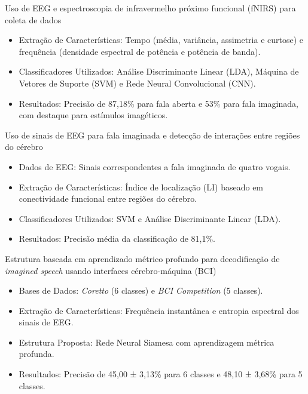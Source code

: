 \documentclass{beamer}
\begin{document}
	\begin{frame}{Uso de EEG e espectroscopia de infravermelho próximo funcional (fNIRS) para coleta de dados \cite{cooney2021bimodal}}
		\begin{itemize}
			\item Extração de Características: Tempo (média, variância, assimetria e curtose) e frequência (densidade espectral de potência e potência de banda).
			\item Classificadores Utilizados: Análise Discriminante Linear (LDA), Máquina de Vetores de Suporte (SVM) e Rede Neural Convolucional (CNN).
			\item Resultados: Precisão de 87,18\% para fala aberta e 53\% para fala imaginada, com destaque para estímulos imagéticos.
		\end{itemize}
		
	\end{frame}
	
	\begin{frame}{Uso de sinais de EEG para fala imaginada e detecção de interações entre regiões do cérebro \cite{bakhshali2022investigating}}
		\begin{itemize}
			\item Dados de EEG: Sinais correspondentes a fala imaginada de quatro vogais.
			\item Extração de Características: Índice de localização (LI) baseado em conectividade funcional entre regiões do cérebro.
			\item Classificadores Utilizados: SVM e Análise Discriminante Linear (LDA).
			\item Resultados: Precisão média da classificação de 81,1\%.
		\end{itemize}
		
	\end{frame}
	
	\begin{frame}{Estrutura baseada em aprendizado métrico profundo para decodificação de \textit{imagined speech} usando interfaces cérebro-máquina (BCI) \cite{lee2021decoding}}
		\begin{itemize}
			\item Bases de Dados: \textit{Coretto} (6 classes) e \textit{BCI Competition} (5 classes).
			\item Extração de Características: Frequência instantânea e entropia espectral dos sinais de EEG.
			\item Estrutura Proposta: Rede Neural Siamesa com aprendizagem métrica profunda.
			\item Resultados: Precisão de 45,00 ± 3,13\% para 6 classes e 48,10 ± 3,68\% para 5 classes.
		\end{itemize}
		
	\end{frame}
\end{document}
